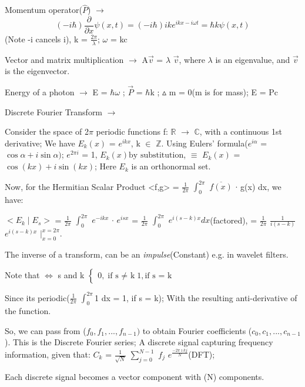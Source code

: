 \documentclass[a4paper, 10pt, onepage]{elegantbook}
\begin{document}
{Momentum operator($\hat P$) $\rightarrow$  
\begin{equation}
(-i \hbar) \frac{\partial}{\partial x} \psi(x,t) = ( -i \hbar) {ik}e^{ikx - i \omega t} =  \hbar k \psi(x,t)
\end{equation}
(Note -i cancels i), k = $\frac{2 \pi}{\lambda}$; $\omega$ = kc  

Vector and matrix multiplication $\rightarrow$ A$\vec{v}$ = $ \lambda$ $\vec{v}$, where $\lambda$ is an eigenvalue, and 
$\vec{v}$ is the eigenvector. 

Energy of a photon $\rightarrow$ E = $\hbar \omega$ ; $\vec{P}$ = $\hbar$k ; $\vartriangle$ m = 0(m is for mass); E = 
Pc 

Discrete Fourier Transform $\rightarrow$  

Consider the space of 2$\pi$ periodic functions f: $\mathbb R$ $\rightarrow$ $\mathbb C$, with a continuous 1st 
derivative;  
We have $E_k(x)$ = $e^{ikx}$, k $\in$ $\mathbb Z$. 
Using Eulers' formula($e^{i \alpha}$ = $\cos \alpha + i \sin \alpha)$; $e^{2 \pi i}$ = 1,
$E_k(x) \text{by substitution}$, $\equiv$ $E_k(x)$ = $\cos(kx) + i \sin(kx)$;
Here $E_k$ is an orthonormal set.  

Now, for the Hermitian Scalar Product <f,g> = $\frac{1}{2 \pi}$ $\int_0^{2 \pi}$ $\overline {f(x)}$ $\cdot$ g(x) dx, we 
have:  

$<E_k \mid E_s>$ =  $\frac{1}{2 \pi}$ $\int_0^{2 \pi}$ $e^{- ikx}$ $\cdot$ $e^{isx}$ = $\frac{1}{2 \pi}$ $\int_0^{2 
\pi}$ $e^{i(s - k)x} dx$(factored),
= $\frac{1}{2 \pi}$ $\frac{1}{i(s - k)}$ $e^{i(s - k)x}$ $|_{x = 0}^{x = 2 \pi}$.  

The inverse of a transform, can be an \emph{impulse}(Constant) e.g. in wavelet filters. 

Note that $\iff$ s and k
$\left\{
\begin{array}{ll}
0,  \text{if s $\neq$ k} 
1,  \text{if s = k}       
\end{array}              
\right.$  
    
Since its periodic($\frac{1}{2 \pi}$ $\int_0^{2 \pi}$1 dx = 1, if s = k); With the resulting anti-derivative of the 
function. 

So, we can pass from ($f_0, f_1,...,f_{n-1})$ to obtain Fourier coefficients ($c_0,c_1,...,c_{n - 1}$). This is the 
Discrete Fourier series; A discrete signal capturing frequency information, given that:  
$C_k$ = $\frac{1}{\sqrt N}$ $\sum_{j = 0}^{N - 1}$ $f_j$ $e^{ \frac{-2 \pi \imath {kj}}{N}}$(DFT); 

Each discrete signal becomes a vector component with (N) components.  

}
\end{document}
